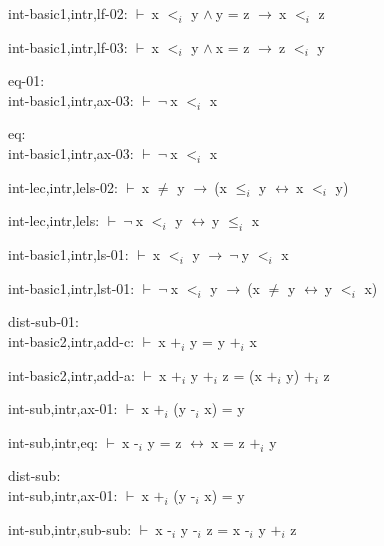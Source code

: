 \documentclass[a4paper]{article}
\newcommand{\Fol}{\mbox{$\vdash\ $}}
\newcommand{\Not}{\mbox{$\neg\ $}}
\newcommand{\And}{\mbox{$\wedge\ $}}
\newcommand{\Imp}{\mbox{$\rightarrow\ $}}
\newcommand{\Equiv}{\mbox{$\leftrightarrow\ $}}
\begin{document}
int-basic1,intr,lf-02: 
 \Fol x $\mbox{$<$}_{i}$ y \And y = z \Imp x $\mbox{$<$}_{i}$ z



int-basic1,intr,lf-03: 
 \Fol x $\mbox{$<$}_{i}$ y \And x = z \Imp z $\mbox{$<$}_{i}$ y



\bigskip

eq-01:\\ int-basic1,intr,ax-03: 
 \Fol \Not x $\mbox{$<$}_{i}$ x



\bigskip

eq:\\ int-basic1,intr,ax-03: 
 \Fol \Not x $\mbox{$<$}_{i}$ x



int-lec,intr,lels-02: 
 \Fol x $\neq$ y \Imp (x $\mbox{$\le$}_{i}$ y \Equiv x $\mbox{$<$}_{i}$ y)



int-lec,intr,lels: 
 \Fol \Not x $\mbox{$<$}_{i}$ y \Equiv y $\mbox{$\le$}_{i}$ x



int-basic1,intr,ls-01: 
 \Fol x $\mbox{$<$}_{i}$ y \Imp \Not y $\mbox{$<$}_{i}$ x



int-basic1,intr,lst-01: 
 \Fol \Not x $\mbox{$<$}_{i}$ y \Imp (x $\neq$ y \Equiv y $\mbox{$<$}_{i}$ x)



\bigskip

dist-sub-01:\\ int-basic2,intr,add-c: 
 \Fol x $\mbox{+}_{i}$ y = y $\mbox{+}_{i}$ x



int-basic2,intr,add-a: 
 \Fol x $\mbox{+}_{i}$ y $\mbox{+}_{i}$ z = (x $\mbox{+}_{i}$ y) $\mbox{+}_{i}$ z



int-sub,intr,ax-01: 
 \Fol x $\mbox{+}_{i}$ (y $\mbox{-}_{i}$ x) = y



int-sub,intr,eq: 
 \Fol x $\mbox{-}_{i}$ y = z \Equiv x = z $\mbox{+}_{i}$ y



\bigskip

dist-sub:\\ int-sub,intr,ax-01: 
 \Fol x $\mbox{+}_{i}$ (y $\mbox{-}_{i}$ x) = y



int-sub,intr,sub-sub: 
 \Fol x $\mbox{-}_{i}$ y $\mbox{-}_{i}$ z = x $\mbox{-}_{i}$ y $\mbox{+}_{i}$ z
\end{document}
